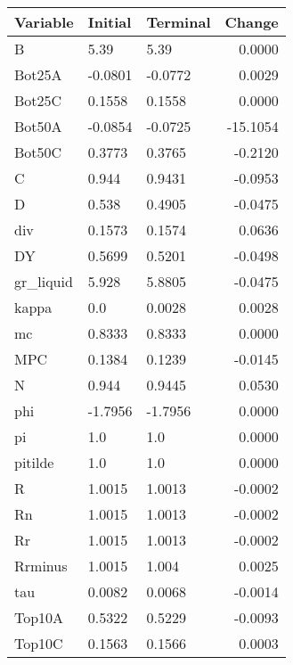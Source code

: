 \begin{table}
\centering
\label{tab:stst_comparison_end_L_wedge_permanent}
\begin{tabular}{lllr}
\toprule
                Variable & Initial & Terminal &   Change \\
\midrule
                       B &    5.39 &     5.39 &   0.0000 \\
                  Bot25A & -0.0801 &  -0.0772 &   0.0029 \\
                  Bot25C &  0.1558 &   0.1558 &   0.0000 \\
                  Bot50A & -0.0854 &  -0.0725 & -15.1054 \\
                  Bot50C &  0.3773 &   0.3765 &  -0.2120 \\
                       C &   0.944 &   0.9431 &  -0.0953 \\
                       D &   0.538 &   0.4905 &  -0.0475 \\
                     div &  0.1573 &   0.1574 &   0.0636 \\
                      DY &  0.5699 &   0.5201 &  -0.0498 \\
               gr\_liquid &   5.928 &   5.8805 &  -0.0475 \\
                   kappa &     0.0 &   0.0028 &   0.0028 \\
                      mc &  0.8333 &   0.8333 &   0.0000 \\
                     MPC &  0.1384 &   0.1239 &  -0.0145 \\
                       N &   0.944 &   0.9445 &   0.0530 \\
                     phi & -1.7956 &  -1.7956 &   0.0000 \\
                      pi &     1.0 &      1.0 &   0.0000 \\
                 pitilde &     1.0 &      1.0 &   0.0000 \\
                       R &  1.0015 &   1.0013 &  -0.0002 \\
                      Rn &  1.0015 &   1.0013 &  -0.0002 \\
                      Rr &  1.0015 &   1.0013 &  -0.0002 \\
                 Rrminus &  1.0015 &    1.004 &   0.0025 \\
                     tau &  0.0082 &   0.0068 &  -0.0014 \\
                  Top10A &  0.5322 &   0.5229 &  -0.0093 \\
                  Top10C &  0.1563 &   0.1566 &   0.0003 \\

\end{tabular}
\end{table}
